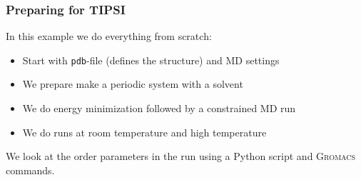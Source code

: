 \documentclass[hyperref={pdfpagelabels=false}]{beamer}
\begin{document}
\begin{frame}
\frametitle{Preparing for \textsc{TIPSI}} 
In this example we do everything from scratch:
\begin{itemize}
\item Start with \texttt{pdb}-file (defines the structure) and MD settings
\item We prepare make a periodic system with a solvent
\item We do energy minimization followed by a constrained MD run
\item We do runs at room temperature and high temperature
\end{itemize}
We look at the order parameters in the run using a Python script and \textsc{Gromacs} commands.
\end{frame}
\end{document}
